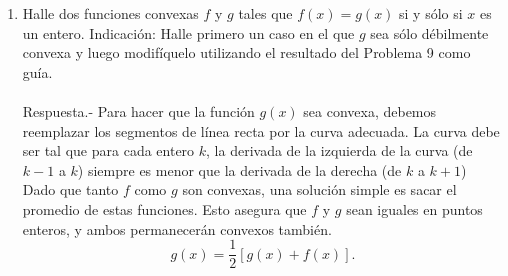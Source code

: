 \begin{enumerate}[\bfseries 1.]
\begin{enumerate}[(a)]
	\end{enumerate}
	\vspace{.5cm}

    \item Halle dos funciones convexas $f$ y $g$ tales que $f(x) = g(x)$ si y sólo si $x$ es un entero. Indicación: Halle primero un caso en el que $g$ sea sólo débilmente convexa y luego modifíquelo utilizando el resultado del Problema 9 como guía.\\\\
	Respuesta.-\; Para hacer que la función $g(x)$ sea convexa, debemos reemplazar los segmentos de línea recta por la curva adecuada. La curva debe ser tal que para cada entero $k$, la derivada de la izquierda de la curva (de $k-1$ a $k$) siempre es menor que la derivada de la derecha (de $k$ a $k+1$)\\
	Dado que tanto $f$ como $g$ son convexas, una solución simple es sacar el promedio de estas funciones. Esto asegura que $f$ y $g$ sean iguales en puntos enteros, y ambos permanecerán convexos también.
	$$g(x)=\dfrac{1}{2}\left[g(x)+f(x)\right].$$\\


\end{enumerate}
